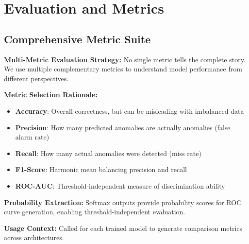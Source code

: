 \documentclass[12pt,a4paper]{article}
\begin{document}
\section{Evaluation and Metrics}

\subsection{Comprehensive Metric Suite}

\textbf{Multi-Metric Evaluation Strategy:} No single metric tells the complete story. We use multiple complementary metrics to understand model performance from different perspectives.

\textbf{Metric Selection Rationale:}
\begin{itemize}
    \item \textbf{Accuracy}: Overall correctness, but can be misleading with imbalanced data
    \item \textbf{Precision}: How many predicted anomalies are actually anomalies (false alarm rate)
    \item \textbf{Recall}: How many actual anomalies were detected (miss rate)
    \item \textbf{F1-Score}: Harmonic mean balancing precision and recall
    \item \textbf{ROC-AUC}: Threshold-independent measure of discrimination ability
\end{itemize}

\textbf{Probability Extraction:} Softmax outputs provide probability scores for ROC curve generation, enabling threshold-independent evaluation.

\textbf{Usage Context:} Called for each trained model to generate comparison metrics across architectures.
\end{document}
